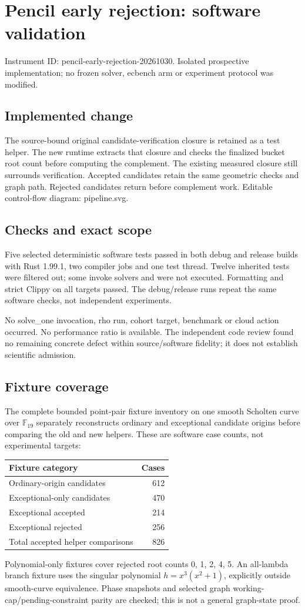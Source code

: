 \documentclass[11pt]{article}
\begin{document}
\setlength{\emergencystretch}{3em}
\section*{Pencil early rejection: software validation}
Instrument ID: pencil-early-rejection-20261030. Isolated prospective implementation; no frozen solver, ecbench arm or experiment protocol was modified.
\subsection*{Implemented change}
The source-bound original candidate-verification closure is retained as a test helper. The new runtime extracts that closure and checks the finalized bucket root count before computing the complement. The existing measured closure still surrounds verification. Accepted candidates retain the same geometric checks and graph path. Rejected candidates return before complement work. Editable control-flow diagram: pipeline.svg.
\subsection*{Checks and exact scope}
Five selected deterministic software tests passed in both debug and release builds with Rust 1.99.1, two compiler jobs and one test thread. Twelve inherited tests were filtered out; some invoke solvers and were not executed. Formatting and strict Clippy on all targets passed. The debug/release runs repeat the same software checks, not independent experiments.\par
No solve\_one invocation, rho run, cohort target, benchmark or cloud action occurred. No performance ratio is available. The independent code review found no remaining concrete defect within source/software fidelity; it does not establish scientific admission.
\subsection*{Fixture coverage}
The complete bounded point-pair fixture inventory on one smooth Scholten curve over $\mathbb F_{19}$ separately reconstructs ordinary and exceptional candidate origins before comparing the old and new helpers. These are software case counts, not experimental targets:
\begin{center}\begin{tabular}{lr}\toprule
Fixture category&Cases\\\midrule
Ordinary-origin candidates&612\\
Exceptional-only candidates&470\\
Exceptional accepted&214\\
Exceptional rejected&256\\
Total accepted helper comparisons&826\\\bottomrule\end{tabular}\end{center}
Polynomial-only fixtures cover rejected root counts 0, 1, 2, 4, 5. An all-lambda branch fixture uses the singular polynomial $h=x^3(x^2+1)$, explicitly outside smooth-curve equivalence. Phase snapshots and selected graph working-cap/pending-constraint parity are checked; this is not a general graph-state proof.
\end{document}
